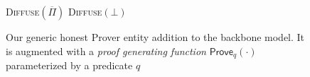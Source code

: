 \begin{figure}[t]
\begin{algorithm}[H]
    \caption{\label{alg.backbone-prover} Our generic honest Prover entity addition to the
        backbone model. It is augmented with a{ \em
        proof generating function} $\textsf{Prove}_q(\cdot)$ parameterized by a
        predicate $q$}
    \begin{algorithmic}[1]
     \Statex
     \Let\chain\varepsilon
                \State\textsc{Diffuse}{$(\overline \Pi)$}
            \Else
                \State\textsc{Diffuse}{$(\bot)$}
            \EndIf
        \EndWhile
        \vskip8pt
    \end{algorithmic}
\end{algorithm}
\end{figure}
